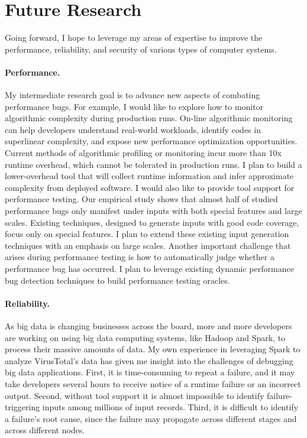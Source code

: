 \documentclass[10pt]{article}
\begin{document}
\section{Future Research}

Going forward, I hope to leverage my areas of expertise to improve the performance, 
reliability, and security of various types of computer systems. 

\vspace{-.1in}
\paragraph{Performance.} 
My intermediate research goal is to advance new aspects of combating performance bugs.
For example, I would like to explore how to monitor algorithmic complexity during production runs. 
On-line algorithmic monitoring can help developers understand real-world workloads, 
identify codes in superlinear complexity, 
and expose new performance optimization opportunities. 
Current methods of algorithmic profiling or monitoring incur more than 10x runtime overhead, which cannot be tolerated in production runs. 
I plan to build a lower-overhead tool that will collect runtime information 
and infer approximate complexity from deployed software. 
I would also like to provide tool support for performance testing.
Our empirical study shows that almost half of studied performance bugs only manifest 
under inputs with both special features and large scales.
Existing techniques, designed to generate inputs with good code coverage, focus only on special features.
I plan to extend these existing input generation techniques with an emphasis on large scales. 
Another important challenge that arises during performance testing is how to automatically judge whether a performance bug has occurred. 
I plan to leverage existing dynamic performance bug detection techniques to build performance testing oracles.

\vspace{-.1in}
\paragraph{Reliability.} 
As big data is changing businesses across the board, 
more and more developers are working on using big data computing systems, 
like Hadoop and Spark, to process their massive amounts of data. 
My own experience in leveraging Spark to analyze VirusTotal's data 
has given me insight into the challenges of debugging big data applications. 
First, it is time-consuming to repeat a failure, and it may take developers several hours to receive notice of a runtime failure or an incorrect output.
Second, without tool support it is almost impossible to identify failure-triggering inputs among millions of input records. 
Third, it is difficult to identify a failure's root cause, since the failure may propagate across different stages and across different nodes.
\end{document}

